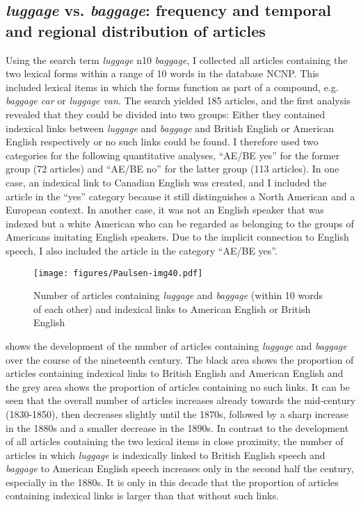 \subsection{\emph{luggage} vs. \emph{baggage}: frequency and temporal and regional distribution of articles}
\label{bkm:Ref7426387}\hypertarget{Toc63021242}{}
Using the search term \emph{luggage} n10 \emph{baggage}, I collected all articles containing the two lexical forms within a range of 10 words in the database NCNP. This included lexical items in which the forms function as part of a compound, e.g. \emph{baggage car} or \emph{luggage van}. The search yielded 185 articles, and the first analysis revealed that they could be divided into two groups: Either they contained indexical links between \emph{luggage} and \emph{baggage} and British English or American English respectively or no such links could be found. I therefore used two categories for the following quantitative analyses, “AE/BE yes” for the former group (72 articles) and “AE/BE no” for the latter group (113 articles). In one case, an indexical link to Canadian English was created, and I included the article in the “yes” category because it still distinguishes a North American and a European context. In another case, it was not an English speaker that was indexed but a white American who can be regarded as belonging to the groups of Americans imitating English speakers. Due to the implicit connection to English speech, I also included the article in the category “AE/BE yes”.

\begin{figure}[b]
\texttt{[image: figures/Paulsen-img40.pdf]}
\caption{
Number of articles containing \emph{luggage} and \emph{baggage} (within 10 words of each other) and indexical links to American English or British English
}
\label{fig:key:40}
\end{figure}


 shows the development of the number of articles containing \emph{luggage} and \emph{baggage} over the course of the nineteenth century. The black area shows the proportion of articles containing indexical links to British English and American English and the grey area shows the proportion of articles containing no such links. It can be seen that the overall number of articles increases already towards the mid-century (1830-1850), then decreases slightly until the 1870s, followed by a sharp increase in the 1880s and a smaller decrease in the 1890s. In contrast to the development of all articles containing the two lexical items in close proximity, the number of articles in which \emph{luggage} is indexically linked to British English speech and \emph{baggage} to American English speech increases only in the second half the century, especially in the 1880s. It is only in this decade that the proportion of articles containing indexical links is larger than that without such links.




